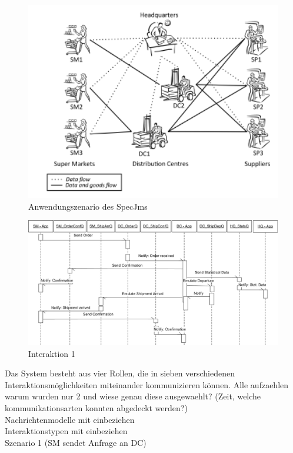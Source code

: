 \begin{figure}
\center
  \includegraphics[width=1\textwidth]{images/specjms_scenario.png}
  \caption{Anwendungszenario des SpecJms}
  \label{img:specjmsInteraction}
\end{figure}
\begin{figure}
\center
  \includegraphics[width=1\textwidth]{images/Interaction1Diag.png}
  \caption{Interaktion 1}
  \label{img:specjmsInteraction1}
\end{figure}
Das System besteht aus vier Rollen, die in sieben verschiedenen Interaktionsmöglichkeiten miteinander kommunizieren können. 
Alle aufzaehlen\\
warum wurden nur 2 und wiese genau diese ausgewaehlt? (Zeit, welche kommunikationsarten konnten abgedeckt werden?)\\
Nachrichtenmodelle mit einbeziehen \\
Interaktionstypen mit einbeziehen \\
Szenario 1 (SM sendet Anfrage an DC)

